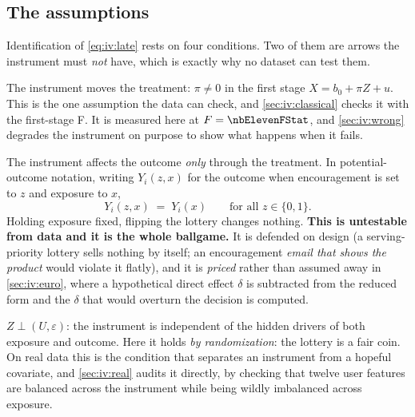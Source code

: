 \subsection*{The assumptions}

Identification of \cref{eq:iv:late} rests on four conditions. Two of them are arrows the instrument
must \emph{not} have, which is exactly why no dataset can test them.

\begin{assumption}[Relevance]\label{as:iv:rel}
The instrument moves the treatment: $\pi \neq 0$ in the first stage $X = b_0 + \pi Z + u$. This is
the one assumption the data can check, and \cref{sec:iv:classical} checks it with the first-stage
F. It is measured here at $F = \nbElevenFStat$, and \cref{sec:iv:wrong} degrades the instrument on
purpose to show what happens when it fails.
\end{assumption}

\begin{assumption}[Exclusion]\label{as:iv:excl}
The instrument affects the outcome \emph{only} through the treatment. In potential-outcome
notation, writing $Y_i(z, x)$ for the outcome when encouragement is set to $z$ and exposure to $x$,
%
\begin{equation}
  Y_i(z, x) \;=\; Y_i(x) \qquad \text{for all } z \in \{0, 1\}.
  \label{eq:iv:exclusion}
\end{equation}
%
Holding exposure fixed, flipping the lottery changes nothing. \textbf{This is untestable from data
and it is the whole ballgame.} It is defended on design (a serving-priority lottery sells nothing
by itself; an encouragement \emph{email that shows the product} would violate it flatly), and it
is \emph{priced} rather than assumed away in \cref{sec:iv:euro}, where a hypothetical direct effect
$\delta$ is subtracted from the reduced form and the $\delta$ that would overturn the decision is
computed.
\end{assumption}

\begin{assumption}[Exogeneity]\label{as:iv:exog}
$Z \perp (U, \varepsilon)$: the instrument is independent of the hidden drivers of both exposure
and outcome. Here it holds \emph{by randomization}: the lottery is a fair coin. On real data this
is the condition that separates an instrument from a hopeful covariate, and \cref{sec:iv:real}
audits it directly, by checking that twelve user features are balanced across the instrument while
being wildly imbalanced across exposure.
\end{assumption}

